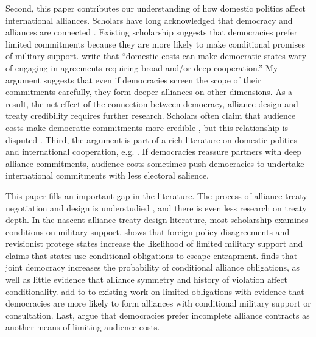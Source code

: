 \documentclass[12pt]{article}
\begin{document}
Second, this paper contributes our understanding of how domestic politics affect international alliances. 
Scholars have long acknowledged that democracy and alliances are connected \citep{LaiReiter2000, GiblerWolford2006, Mattes2012, Warren2016, McManusYarhi-Milo2017}. 
Existing scholarship suggests that democracies prefer limited commitments \citep{Mattes2012, Chibaetal2015, FjelstulReiter2019} because they are more likely to make conditional promises of military support. 
\citet{Chibaetal2015} write that ``domestic costs can make democratic states wary of engaging in agreements requiring broad and/or deep cooperation.'' 
My argument suggests that even if democracies screen the scope of their commitments carefully, they form deeper alliances on other dimensions.  
As a result, the net effect of the connection between democracy, alliance design and treaty credibility requires further research.
Scholars often claim that audience costs make democratic commitments more credible \citep{Gaubatz1996, Leedsetal2009, PotterBaum2014, DigiuseppePoast2016}, but this relationship is disputed \citep{GartzkeGleditsch2004, DownesSechser2012}.  
Third, the argument is part of a rich literature on domestic politics and international cooperation, e.g. \citep{DownesRocke1995, Fearon1998, Leeds1999, MattesRodriguez2014}. 
If democracies reassure partners with deep alliance commitments, audience costs sometimes push democracies to undertake international commitments with less electoral salience. 


This paper fills an important gap in the literature. 
The process of alliance treaty negotiation and design is understudied \citep{Poast2019a}, and there is even less research on treaty depth. 
In the nascent alliance treaty design literature, most scholarship examines conditions on military support.
\citet{Benson2012} shows that foreign policy disagreements and revisionist protege states increase the likelihood of limited military support and \citet{Kim2011} claims that states use conditional obligations to escape entrapment. 
\citet{Mattes2012} finds that joint democracy increases the probability of conditional alliance obligations, as well as little evidence that alliance symmetry and history of violation affect conditionality. 
\citet{Chibaetal2015} add to to existing work on limited obligations with evidence that democracies are more likely to form alliances with conditional military support or consultation. 
Last, \citet{FjelstulReiter2019} argue that democracies prefer incomplete alliance contracts as another means of limiting audience costs. 
\end{document}
